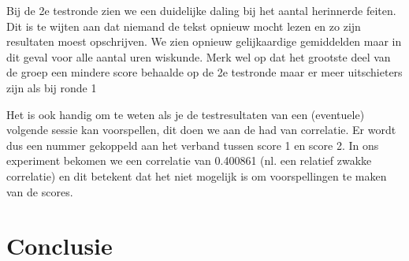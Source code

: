 \documentclass{hogent-article}
\begin{document}
	Bij de 2e testronde zien we een duidelijke daling bij het aantal herinnerde feiten. Dit is te wijten aan dat niemand de tekst opnieuw mocht lezen en zo zijn resultaten moest opschrijven. We zien opnieuw gelijkaardige gemiddelden maar in dit geval voor alle aantal uren wiskunde. Merk wel op dat het grootste deel van de groep een mindere score behaalde op de 2e testronde maar er meer uitschieters zijn als bij ronde 1
	
	Het is ook handig om te weten als je de testresultaten van een (eventuele) volgende sessie kan voorspellen, dit doen we aan de had van correlatie. Er wordt dus een nummer gekoppeld aan het verband tussen score 1 en score 2. In ons experiment bekomen we een correlatie van 0.400861 (nl. een relatief zwakke correlatie) en dit betekent dat het niet mogelijk is om voorspellingen te maken van de scores.
	
	
	
	\section{Conclusie}
	
	\lipsum[22-23]
	
	
	\printbibliography[heading=bibintoc]
	
\end{document}
